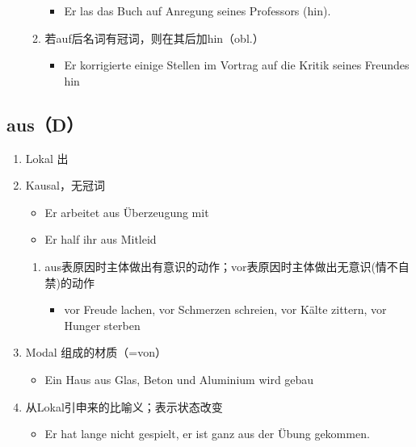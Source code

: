 \documentclass[UTF8]{report}
\begin{document}
\begin{enumerate}
\begin{enumerate}
        \begin{itemize}
            \item Er las das Buch auf Anregung seines Professors (hin).
        \end{itemize}
        \item 若auf后名词有冠词，则在其后加hin（obl.）
        \begin{itemize}
            \item Er korrigierte einige Stellen im Vortrag auf die Kritik seines Freundes hin
        \end{itemize}
    \end{enumerate}
\end{enumerate}
\subsection{aus（D）}
\begin{enumerate}
    \item Lokal 出
    \item Kausal，无冠词
    \begin{itemize}
        \item Er arbeitet aus Überzeugung mit
        \item Er half ihr aus Mitleid
    \end{itemize}
    \begin{enumerate}
        \item aus表原因时主体做出有意识的动作；vor表原因时主体做出无意识(情不自禁)的动作
        \begin{itemize}
            \item vor Freude lachen, vor Schmerzen schreien, vor Kälte zittern, vor Hunger sterben
        \end{itemize}
    \end{enumerate}
    \item Modal 组成的材质（=von）
    \begin{itemize}
        \item Ein Haus aus Glas, Beton und Aluminium wird gebau
    \end{itemize}
    \item 从Lokal引申来的比喻义；表示状态改变
    \begin{itemize}
        \item Er hat lange nicht gespielt, er ist ganz aus der Übung gekommen.
    \end{itemize}
\end{enumerate}
\end{document}
